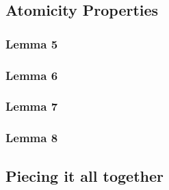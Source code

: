 \subsection{Atomicity Properties}
\begin{frame}
    \frametitle{Lemma 5}
\end{frame}
\begin{frame}
    \frametitle{Lemma 6}
\end{frame}
\begin{frame}
    \frametitle{Lemma 7}
\end{frame}
\begin{frame}
    \frametitle{Lemma 8}
\end{frame}

\subsection{Piecing it all together}
\begin{frame}
\end{frame}
